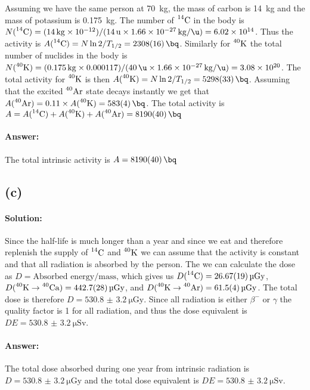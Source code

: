 Assuming we have the same person at \SI[]{70}{\kg}, the mass of carbon is \SI[]{14}{\kg} and the mass of potassium is \SI[]{0.175}{\kg}. The number of $\nuc{C}{14}$ in the body is $N(\nuc{C}{14}) = (\SI[]{14}{\kg} \times 10^{-12})/(\SI{14}{u} \times \SI{1.66e-27}{\kg\per\u}) = 6.02 \times 10^{14}$. Thus the activity is $A(\nuc{C}{14}) = N \ln{2}/T_{1/2} = \SI{2308(16)}{\bq}$. Similarly for $\nuc{K}{40}$ the total number of nuclides in the body is $N(\nuc{K}{40}) = (\SI[]{0.175}{\kg} \times 0.000117)/(\SI{40}{\u} \times \SI{1.66e-27}{\kg\per\u}) = 3.08 \times 10^{20}$. The total activity for $\nuc{K}{40}$ is then $A(\nuc{K}{40}) = N \ln{2}/T_{1/2} = \SI{5298(33)}{\bq}$. Assuming that the excited $\nuc{Ar}{40}$ state decays instantly we get that $A(\nuc{Ar}{40}) = 0.11 \times A(\nuc{K}{40}) = \SI{583(4)}{\bq}$. The total activity is $A =  A(\nuc{C}{14}) + A(\nuc{K}{40}) + A(\nuc{Ar}{40}) = \SI{8190(40)}{\bq}$

\paragraph{Answer:} The total intrinsic activity is $A = \SI{8190(40)}{\bq}$

\subsection*{(c)}
\paragraph{Solution:} Since the half-life is much longer than a year and since we eat and therefore replenish the supply of $\nuc{C}{14}$ and $\nuc{K}{40}$ we can assume that the activity is constant and that all radiation is absorbed by the person. The we can calculate the dose as $D = \text{Absorbed energy} / \text{mass}$, which gives us $D(\nuc{C}{14}) = \SI{26.67(19)}{\micro\gray}$, $D(\nuc{K}{40} \to \nuc{Ca}{40}) = \SI{442.7(28)}{\micro\gray}$, and $D(\nuc{K}{40} \to \nuc{Ar}{40}) = \SI{61.5(4)}{\micro\gray}$. The total dose is therefore $D = \SI{530.8(32)}{\micro\gray}$. Since all radiation is either $\beta^-$ or $\gamma$ the quality factor is 1 for all radiation, and thus the dose equivalent is $DE = \SI{530.8(32)}{\micro\sievert}$.

\paragraph{Answer:} The total dose absorbed during one year from intrinsic radiation is $D = \SI{530.8(32)}{\micro\gray}$ and the total dose equivalent is  $DE = \SI{530.8(32)}{\micro\sievert}$.